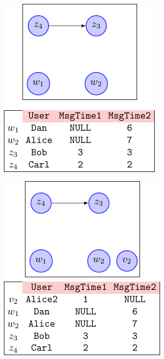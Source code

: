 \begin{figure}[!ph]
\begin{minipage}[b]{.3\linewidth}
		\label{fig:conj_left}
	\end{minipage}
	\begin{minipage}[b]{.35\linewidth}
		\centering
		\includegraphics[scale=0.8]{fig/03joins/cong_right}
		\label{fig:conj_right}
	\end{minipage}
	\begin{minipage}[b]{.3\linewidth}
		\centering
		\includegraphics[scale=0.8]{fig/03joins/cong_both}
		\label{fig:conj_both}
	\end{minipage}
	\begin{minipage}[b]{.3\linewidth}
		\centering

\end{minipage}
\end{figure}
